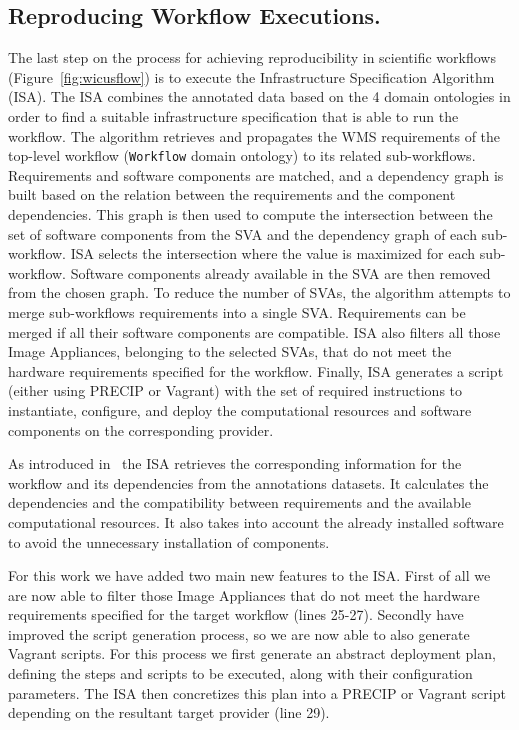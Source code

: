\subsection{Reproducing Workflow Executions.}

The last step on the process for achieving reproducibility in scientific workflows (Figure~\ref{fig:wicusflow}) is to execute the Infrastructure Specification Algorithm (ISA). The ISA combines the annotated data based on the 4 domain ontologies in order to find a suitable infrastructure specification that is able to run the workflow. The algorithm retrieves and propagates the WMS requirements of the top-level workflow (\texttt{Workflow} domain ontology) to its related sub-workflows. Requirements and software components are matched, and a dependency graph is built based on the relation between the requirements and the component dependencies. This graph is then used to compute the intersection between the set of software components from the SVA and the dependency graph of each sub-workflow. ISA selects the intersection where the value is maximized for each sub-workflow. Software components already available in the SVA are then removed from the chosen graph. To reduce the number of SVAs, the algorithm attempts to merge sub-workflows requirements into a single SVA. Requirements can be merged if all their software components are compatible. ISA also filters all those Image Appliances, belonging to the selected SVAs, that do not meet the hardware requirements specified for the workflow. Finally, ISA generates a script (either using PRECIP or Vagrant) with the set of required instructions to instantiate, configure, and deploy the computational resources and software components on the corresponding provider.

As introduced in~\cite{wicus} the ISA retrieves the corresponding information for the workflow and its dependencies from the annotations datasets. It calculates the dependencies and the compatibility between requirements and the available computational resources. It also takes into account the already installed software to avoid the unnecessary installation of components.

For this work we have added two main new features to the ISA. First of all we are now able to filter those Image Appliances that do not meet the hardware requirements specified for the target workflow (lines 25-27). Secondly have improved the script generation process, so we are now able to also generate Vagrant scripts. For this process we first generate an abstract deployment plan, defining the steps and scripts to be executed, along with their configuration parameters. The ISA then concretizes this plan into a PRECIP or Vagrant script depending on the resultant target provider (line 29).

